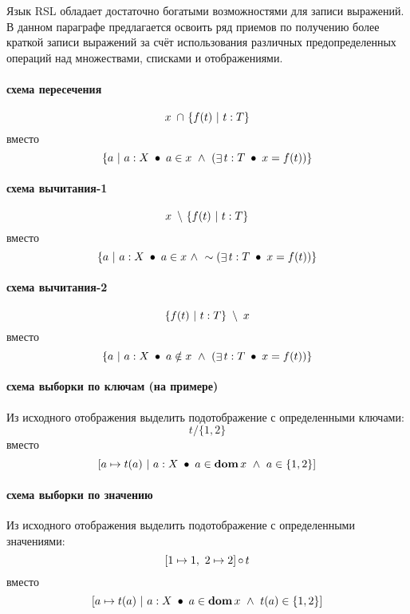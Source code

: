 Язык RSL обладает достаточно богатыми возможностями для записи выражений. В данном параграфе предлагается освоить ряд приемов по получению более краткой записи выражений за счёт использования различных предопределенных операций над множествами, списками и отображениями.

\paragraph{схема пересечения}

$$x~\mathop{\cap}~ \{f(t) ~|~ t:T\}$$ вместо $$\{a ~|~ a: X ~\mathop{\bullet}~ a \in x ~\wedge~ ( \mathop{\exists} t: T  ~\mathop{\bullet}~ x = f(t) ) \}$$

\paragraph{схема вычитания-1}

$$x ~\mathop{\setminus}~ \{f(t) ~|~ t:T\}$$ вместо $$\{a ~|~ a: X ~\mathop{\bullet}~ a \in x ~\wedge~  \sim( \mathop{\exists} t: T  ~\mathop{\bullet}~ x = f(t) ) \}$$

\paragraph{схема вычитания-2}

$$\{f(t) ~|~ t:T\} ~\mathop{\setminus}~ x$$ вместо $$\{a ~|~ a: X ~\mathop{\bullet}~ a \notin x ~\wedge~ ( \mathop{\exists} t: T  ~\mathop{\bullet}~ x = f(t) ) \}$$

\paragraph{схема выборки по ключам (на примере)}
Из исходного отображения выделить подотображение с определенными ключами:
$$t / \{1, 2\}$$ вместо $$[a \mapsto t(a) ~|~ a:X ~\mathop{\bullet}~ a \in \mathop{\textbf{dom}} x ~\wedge~ a \in \{1, 2\} ]$$

\paragraph{схема выборки по значению}
Из исходного отображения выделить подотображение с определенными значениями:
$$[1 \mapsto 1,~ 2 \mapsto 2] \mathop{\circ} t$$ вместо $$[a \mapsto t(a) ~|~ a:X ~\mathop{\bullet}~ a \in \mathop{\textbf{dom}} x ~\wedge~ t(a) \in \{1,2\} ]$$

%


